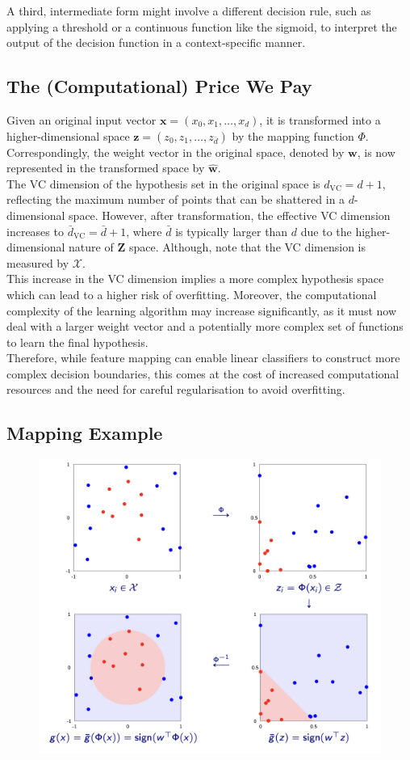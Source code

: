 A third, intermediate form might involve a different decision rule, such as applying a threshold or a continuous function like the sigmoid, to interpret the output of the decision function in a context-specific manner.

\subsection{The (Computational) Price We Pay}
Given an original input vector \( \mathbf{x} = (x_0, x_1, \ldots, x_d) \), it is transformed into a higher-dimensional space \( \mathbf{z} = (z_0, z_1, \ldots, z_{\bar{d}}) \) by the mapping function \( \Phi \). Correspondingly, the weight vector in the original space, denoted by \( \mathbf{w} \), is now represented in the transformed space by \( \mathbf{\hat{w}} \).\\

The VC dimension of the hypothesis set in the original space is \( d_{\text{VC}} = d + 1 \), reflecting the maximum number of points that can be shattered in a \( d \)-dimensional space. However, after transformation, the effective VC dimension increases to \( \bar{d}_{\text{VC}} = \bar{d} + 1 \), where \( \bar{d} \) is typically larger than \( d \) due to the higher-dimensional nature of \( \mathbf{Z} \) space. Although, note that the VC dimension is measured by $\mathcal{X}$.\\

This increase in the VC dimension implies a more complex hypothesis space which can lead to a higher risk of overfitting. Moreover, the computational complexity of the learning algorithm may increase significantly, as it must now deal with a larger weight vector and a potentially more complex set of functions to learn the final hypothesis.\\

Therefore, while feature mapping can enable linear classifiers to construct more complex decision boundaries, this comes at the cost of increased computational resources and the need for careful regularisation to avoid overfitting.\\

\subsection{Mapping Example}
\begin{figure}[H]
    \centering
    \includegraphics[width=0.5\linewidth]{img/non-linear-example.png}
\end{figure}

